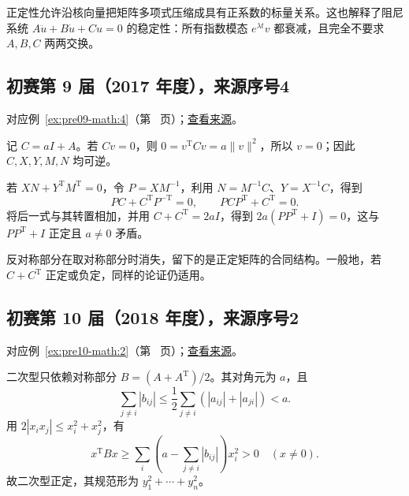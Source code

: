 \documentclass[12pt,fontset=fandol]{ctexart}
\begin{document}
\begin{remark}[方法与条件]

正定性允许沿核向量把矩阵多项式压缩成具有正系数的标量关系。这也解释了阻尼系统 $A\ddot u+B\dot u+Cu=0$ 的稳定性：所有指数模态 $e^{\lambda t}v$ 都衰减，且完全不要求 $A,B,C$ 两两交换。

\end{remark}

\subsection{初赛第 9 届（2017 年度），来源序号4}\label{ans:pre09-math:4}\label{pr:pre09-math:4}

对应例~\ref{ex:pre09-math:4}（第~\pageref{ex:pre09-math:4} 页）；\href{https://github.com/lzxcr/cmc-mathematics/blob/64916fa1fdbc3e444a652eca204d5669058ee321/src/problems/preliminary/09/04.md}{查看来源}。

\begin{solve}

记 $C=aI+A$。若 $Cv=0$，则 $0=v^{\mathrm T}Cv=a\|v\|^2$，所以 $v=0$；因此 $C,X,Y,M,N$ 均可逆。

若 $XN+Y^{\mathrm T}M^{\mathrm T}=0$，令 $P=XM^{-1}$，利用 $N=M^{-1}C$、$Y=X^{-1}C$，得到
\[
PC+C^{\mathrm T}P^{-\mathrm T}=0,
\qquad PCP^{\mathrm T}+C^{\mathrm T}=0.
\]
将后一式与其转置相加，并用 $C+C^{\mathrm T}=2aI$，得到 $2a(PP^{\mathrm T}+I)=0$，这与 $PP^{\mathrm T}+I$ 正定且 $a\ne0$ 矛盾。

\end{solve}

\begin{remark}[方法与条件]

反对称部分在取对称部分时消失，留下的是正定矩阵的合同结构。一般地，若 $C+C^{\mathrm T}$ 正定或负定，同样的论证仍适用。

\end{remark}

\subsection{初赛第 10 届（2018 年度），来源序号2}\label{ans:pre10-math:2}\label{pr:pre10-math:2}

对应例~\ref{ex:pre10-math:2}（第~\pageref{ex:pre10-math:2} 页）；\href{https://github.com/lzxcr/cmc-mathematics/blob/64916fa1fdbc3e444a652eca204d5669058ee321/src/problems/preliminary/10/02.md}{查看来源}。

\begin{solve}

二次型只依赖对称部分 $B=(A+A^{\mathrm T})/2$。其对角元为 $a$，且
\[
\sum_{j\ne i}|b_{ij}|
\le\frac12\sum_{j\ne i}(|a_{ij}|+|a_{ji}|)<a.
\]
用 $2|x_ix_j|\le x_i^2+x_j^2$，有
\[
x^{\mathrm T}Bx\ge\sum_i\left(a-\sum_{j\ne i}|b_{ij}|\right)x_i^2>0
\quad(x\ne0).
\]
故二次型正定，其规范形为 $\boxed{y_1^2+\cdots+y_n^2}$。

\end{solve}
\end{document}
